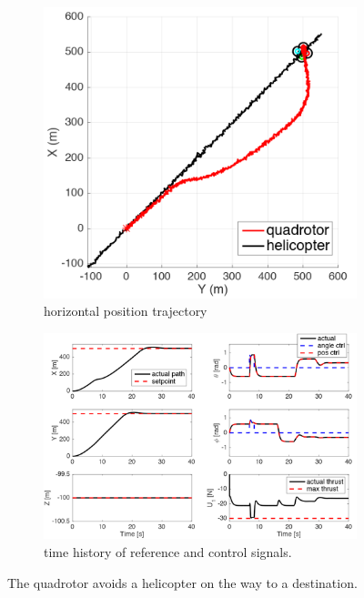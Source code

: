\documentclass[journal,11pt,onecolumn,draftclsnofoot,]{IEEEtran}
\begin{document}
\begin{figure}
	\centering
	\begin{subfigure}[b]{0.35\columnwidth}
		\centering
		\includegraphics[width=\columnwidth]{trajectory}
		\caption{horizontal position trajectory}
		\label{fig:trajectory}
	\end{subfigure}
	\hfill
	\begin{subfigure}[b]{0.64\columnwidth}
		\centering
		\includegraphics[width=\columnwidth]{tracking}
		\caption{time history of reference and control signals.}
		\label{fig:tracking}
	\end{subfigure}
	
	\caption{The quadrotor avoids a helicopter on the way to a destination.}
	\label{fig:waypoint_avoidance}
\end{figure}
\end{document}
